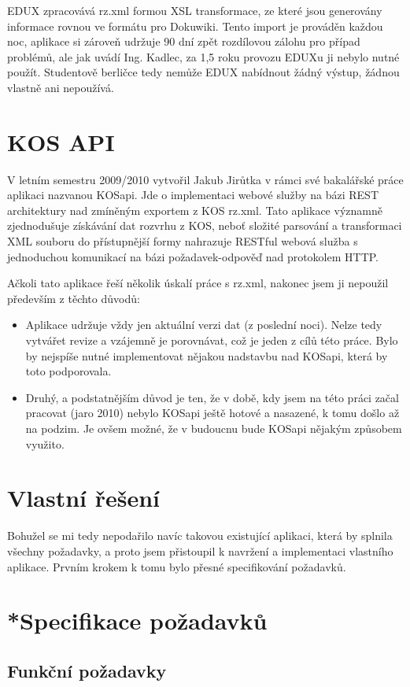 \documentclass[11pt,twoside,a4paper]{book}
\begin{document}
EDUX zpracovává rz.xml formou XSL transformace, ze které jsou generovány informace rovnou ve formátu pro Dokuwiki. Tento import je prováděn každou noc, aplikace si zároveň udržuje 90 dní zpět rozdílovou zálohu pro případ problémů, ale jak uvádí Ing. Kadlec, za 1,5 roku provozu EDUXu ji nebylo nutné použít. Studentově berličce tedy nemůže EDUX nabídnout žádný výstup, žádnou  vlastně ani nepoužívá.

\section{KOS API}
V letním semestru 2009/2010 vytvořil Jakub Jirůtka v rámci své bakalářské práce\cite{jirutka} aplikaci nazvanou KOSapi. Jde o implementaci webové služby na bázi REST architektury nad zmíněným exportem z KOS rz.xml. Tato aplikace významně zjednodušuje získávání dat rozvrhu z KOS, neboť složité parsování a transformaci XML souboru do přístupnější formy nahrazuje RESTful webová služba s jednoduchou komunikací na bázi požadavek-odpověď nad protokolem HTTP.

Ačkoli tato aplikace řeší několik úskalí práce s rz.xml, nakonec jsem ji nepoužil především z těchto důvodů:
\begin{itemize}
\item Aplikace udržuje vždy jen aktuální verzi dat (z poslední noci). Nelze tedy vytvářet revize a vzájemně je porovnávat, což je jeden z cílů této práce. Bylo by nejspíše nutné implementovat nějakou nadstavbu nad KOSapi, která by toto podporovala.
\item Druhý, a podstatnějším důvod je ten, že v době, kdy jsem na této práci začal pracovat (jaro 2010) nebylo KOSapi ještě hotové a nasazené, k tomu došlo až na podzim. Je ovšem možné, že v budoucnu bude KOSapi nějakým způsobem využito.
\end{itemize}

\section{Vlastní řešení}
Bohužel se mi tedy nepodařilo navíc takovou existující aplikaci, která by splnila všechny požadavky, a proto jsem přistoupil k navržení a implementaci vlastního aplikace. Prvním krokem k tomu bylo přesné specifikování požadavků.
\section{*Specifikace požadavků}
\subsection{Funkční požadavky}
\end{document}
